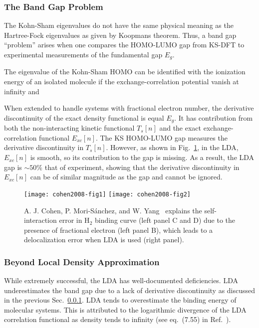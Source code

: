 \subsubsection{The Band Gap Problem} \label{sec:method-dft-bandgap}
The Kohn-Sham eigenvalues do not have the same physical meaning as the Hartree-Fock eigenvalues as given by Koopmans theorem. Thus, a band gap ``problem'' arises when one compares the HOMO-LUMO gap from KS-DFT to experimental measurements of the fundamental gap $E_g$.

The eigenvalue of the Kohn-Sham HOMO can be identified with the ionization energy of an isolated molecule if the exchange-correlation potential vanish at infinity and 

When extended to handle systems with fractional electron number, the derivative discontinuity of the exact density functional is equal $E_g$. It has contribution from both the non-interacting kinetic functional $T_s[n]$ and the exact exchange-correlation functional $E_{xc}[n]$. The KS HOMO-LUMO gap measures the derivative discontinuity in $T_s[n]$. However, as shown in Fig.~\ref{fig:method-dft-smooth-lda}, in the LDA, $E_{xc}[n]$ is smooth, so its contribution to the gap is missing. As a result, the LDA gap is $\sim 50\%$ that of experiment, showing that the derivative discontinuity in $E_{xc}[n]$ can be of similar magnitude as the gap and cannot be ignored.

\begin{figure}[h]
\texttt{[image: cohen2008-fig1]}
\texttt{[image: cohen2008-fig2]}
\caption{A. J. Cohen, P. Mori-S\'anchez, and W. Yang~\cite{Cohen2008} explains the self-interaction error in H$_2$ binding curve (left panel C and D) due to the presence of fractional electron (left panel B), which leads to a delocalization error when LDA is used (right panel).}
\label{fig:method-dft-smooth-lda}
\end{figure}


\subsubsection{Beyond Local Density Approximation}

While extremely successful, the LDA has well-documented deficiencies. LDA underestimates the band gap due to a lack of derivative discontinuity as discussed in the previous Sec.~\ref{sec:method-dft-bandgap}. LDA tends to overestimate the binding energy of molecular systems. This is attributed to the logarithmic divergence of the LDA correlation functional as density tends to infinity (see eq.~(7.55) in Ref.~\cite{Giuliani2005}).

